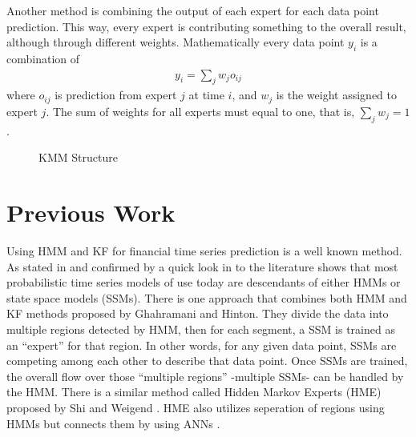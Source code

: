 Another method is combining the output of each expert for each data point
prediction. This way, every expert is contributing something to the overall
result, although through different weights. Mathematically every data point
$y_i$ is a combination of
\begin{eqnarray*}
y_i = \sum_j w_j o_{ij}
\end{eqnarray*}
where $o_{ij}$ is prediction from expert $j$ at time $i$, and $w_j$ is the
weight assigned to expert $j$. The sum of weights for all experts must equal to
one, that is, $\sum_j w_j = 1$. 

\begin{figure}[h]
\caption{KMM Structure}
\vspace{0.6cm}
\end{figure}


\section{Previous Work} \label{prevwork}

Using HMM and KF for financial time series prediction is a well known method. As
stated in \cite{ghahramani3} and confirmed by a quick look in to the literature
shows that most probabilistic time series models of use today are descendants of
either HMMs or state space models (SSMs). There is one approach that combines
both HMM and KF methods proposed by Ghahramani and Hinton. They divide the data
into multiple regions detected by HMM, then for each segment, a SSM is trained
as an ``expert'' for that region. In other words, for any given data point, SSMs
are competing among each other to describe that data point. Once SSMs are
trained, the overall flow over those ``multiple regions'' -multiple SSMs- can be
handled by the HMM. There is a similar method called Hidden Markov Experts (HME)
proposed by Shi and Weigend \cite{shi}. HME also utilizes seperation of regions
using HMMs but connects them by using ANNs \cite{nabney}.

